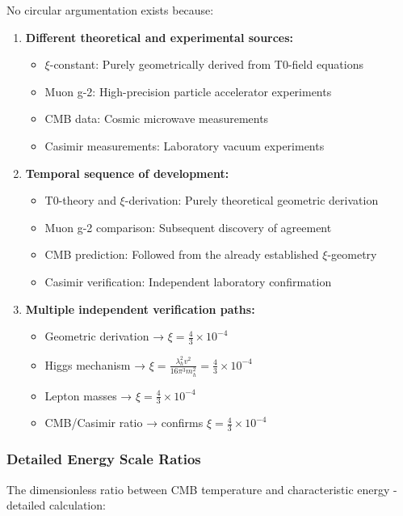 \documentclass[12pt,a4paper]{report}
\begin{document}
	No circular argumentation exists because:
	
	\begin{enumerate}
		\item \textbf{Different theoretical and experimental sources:}
		\begin{itemize}
			\item $\xi$-constant: Purely geometrically derived from T0-field equations
			\item Muon g-2: High-precision particle accelerator experiments
			\item CMB data: Cosmic microwave measurements
			\item Casimir measurements: Laboratory vacuum experiments
		\end{itemize}
		
		\item \textbf{Temporal sequence of development:}
		\begin{itemize}
			\item T0-theory and $\xi$-derivation: Purely theoretical geometric derivation
			\item Muon g-2 comparison: Subsequent discovery of agreement
			\item CMB prediction: Followed from the already established $\xi$-geometry
			\item Casimir verification: Independent laboratory confirmation
		\end{itemize}
		
		\item \textbf{Multiple independent verification paths:}
		\begin{itemize}
			\item Geometric derivation → $\xi = \frac{4}{3} \times 10^{-4}$
			\item Higgs mechanism → $\xi = \frac{\lambda_h^2 v^2}{16\pi^3 m_h^2} = \frac{4}{3} \times 10^{-4}$
			\item Lepton masses → $\xi = \frac{4}{3} \times 10^{-4}$
			\item CMB/Casimir ratio → confirms $\xi = \frac{4}{3} \times 10^{-4}$
		\end{itemize}
	\end{enumerate}
	
	\subsubsection{Detailed Energy Scale Ratios}
	
	The dimensionless ratio between CMB temperature and characteristic energy - detailed calculation:
	
\end{document}
